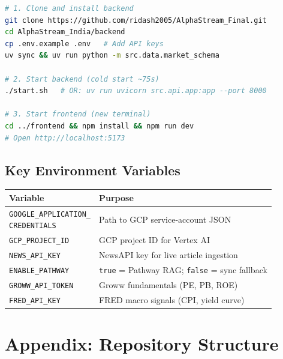 \documentclass[11pt, a4paper]{article}
\begin{document}
\begin{lstlisting}[language=bash]
# 1. Clone and install backend
git clone https://github.com/ridash2005/AlphaStream_Final.git
cd AlphaStream_India/backend
cp .env.example .env   # Add API keys
uv sync && uv run python -m src.data.market_schema

# 2. Start backend (cold start ~75s)
./start.sh   # OR: uv run uvicorn src.api.app:app --port 8000

# 3. Start frontend (new terminal)
cd ../frontend && npm install && npm run dev
# Open http://localhost:5173
\end{lstlisting}

\subsection{Key Environment Variables}

\begin{center}
\small
\begin{tabular}{L{5.5cm} L{7.8cm}}
  \toprule
  \textbf{Variable} & \textbf{Purpose} \\
  \midrule
  \texttt{\small GOOGLE\_APPLICATION\_\newline CREDENTIALS} & Path to GCP service-account JSON \\
  \texttt{GCP\_PROJECT\_ID}    & GCP project ID for Vertex AI \\
  \texttt{NEWS\_API\_KEY}      & NewsAPI key for live article ingestion \\
  \texttt{ENABLE\_PATHWAY}     & \texttt{true} = Pathway RAG; \texttt{false} = sync fallback \\
  \texttt{GROWW\_API\_TOKEN}   & Groww fundamentals (PE, PB, ROE) \\
  \texttt{FRED\_API\_KEY}      & FRED macro signals (CPI, yield curve) \\
  \bottomrule
\end{tabular}
\end{center}

\section*{Appendix: Repository Structure}
\end{document}

